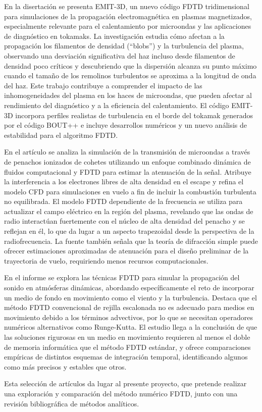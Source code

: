 En la disertación \cite{williams_full-wave_2014} se presenta EMIT-3D, un nuevo código FDTD tridimensional para simulaciones de la propagación electromagnética en plasmas magnetizados, especialmente relevante para el calentamiento por microondas y las aplicaciones de diagnóstico en tokamaks. La investigación estudia cómo afectan a la propagación los filamentos de densidad (“blobs”) y la turbulencia del plasma, observando una desviación significativa del haz incluso desde filamentos de densidad poco críticos y descubriendo que la dispersión alcanza su punto máximo cuando el tamaño de los remolinos turbulentos se aproxima a la longitud de onda del haz. Este trabajo contribuye a comprender el impacto de las inhomogeneidades del plasma en los haces de microondas, que pueden afectar al rendimiento del diagnóstico y a la eficiencia del calentamiento. El código EMIT-3D incorpora perfiles realistas de turbulencia en el borde del tokamak generados por el código BOUT++ e incluye desarrollos numéricos y un nuevo análisis de estabilidad para el algoritmo FDTD.

En el artículo \cite{kinefuchi_prediction_2013} se analiza la simulación de la transmisión de microondas a través de penachos ionizados de cohetes utilizando un enfoque combinado dinámica de fluidos computacional y FDTD para estimar la atenuación de la señal. Atribuye la interferencia a los electrones libres de alta densidad en el escape y refina el modelo CFD para simulaciones en vuelo a fin de incluir la combustión turbulenta no equilibrada. El modelo FDTD dependiente de la frecuencia se utiliza para actualizar el campo eléctrico en la región del plasma, revelando que las ondas de radio interactúan fuertemente con el núcleo de alta densidad del penacho y se reflejan en él, lo que da lugar a un aspecto trapezoidal desde la perspectiva de la radiofrecuencia. La fuente también señala que la teoría de difracción simple puede ofrecer estimaciones aproximadas de atenuación para el diseño preliminar de la trayectoria de vuelo, requiriendo menos recursos computacionales.

En el informe \cite{wilson_finite-difference_2004} se explora las técnicas FDTD para simular la propagación del sonido en atmósferas dinámicas, abordando específicamente el reto de incorporar un medio de fondo en movimiento como el viento y la turbulencia. Destaca que el método FDTD convencional de rejilla escalonada no es adecuado para medios en movimiento debido a los términos advectivos, por lo que se necesitan operadores numéricos alternativos como Runge-Kutta. El estudio llega a la conclusión de que las soluciones rigurosas en un medio en movimiento requieren al menos el doble de memoria informática que el método FDTD estándar, y ofrece comparaciones empíricas de distintos esquemas de integración temporal, identificando algunos como más precisos y estables que otros.


Esta selección de artículos da lugar al presente proyecto, que pretende realizar una exploración y comparación del método numérico FDTD, junto con una revisión bibliográfica de métodos analíticos.